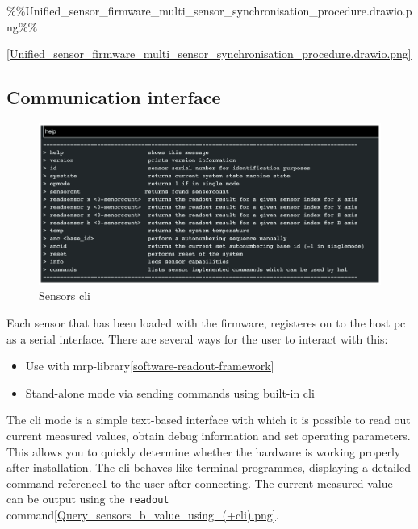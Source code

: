 \%\%Unified\_sensor\_firmware\_multi\_sensor\_synchronisation\_procedure.drawio.png\%\%

\ref{Unified_sensor_firmware_multi_sensor_synchronisation_procedure.drawio.png}

\hypertarget{communication-interface}{%
\subsection{Communication interface}\label{communication-interface}}

\begin{figure}
\centering
\includegraphics{./generated_images/border_Sensors_(+cli).png}
\caption{Sensors \gls{cli} \label{Sensors_(+cli).png}}
\end{figure}

Each sensor that has been loaded with the firmware, registeres on to the
host \gls{pc} as a serial interface. There are several ways for the user
to interact with this:

\begin{itemize}
\tightlist
\item
  Use with \gls{mrp}-library\ref{software-readout-framework}
\item
  Stand-alone mode via sending commands using built-in \gls{cli}
\end{itemize}

The \gls{cli} mode is a simple text-based interface with which it is
possible to read out current measured values, obtain debug information
and set operating parameters. This allows you to quickly determine
whether the hardware is working properly after installation. The
\gls{cli} behaves like terminal programmes, displaying a detailed
command reference\ref{Sensors_(+cli).png} to the user after connecting.
The current measured value can be output using the
\passthrough{\lstinline!readout!}
command\ref{Query_sensors_b_value_using_(+cli).png}.

